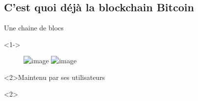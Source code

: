 \documentclass[presentation]{beamer}
\begin{document}
\subsection{C'est quoi déjà la blockchain Bitcoin}
\label{sec:org37da688}
\begin{frame}[label={sec:org26c2e95}]{Une chaine de blocs}
\begin{block}<1->{}
\begin{figure}[ht]
   \centering
   \includegraphics<1>[width=\textwidth]{Images/anatomy-of-a-chain-1.png}
   \includegraphics<2>[width=.3\textwidth]{Images/anatomy-of-a-chain-1.png}   
\end{figure}
\end{block}

\begin{block}<2>{Maintenu par ses utilisateurs}

\begin{block}<2>{}
\end{block}
\end{block}
\end{frame}
\end{document}
